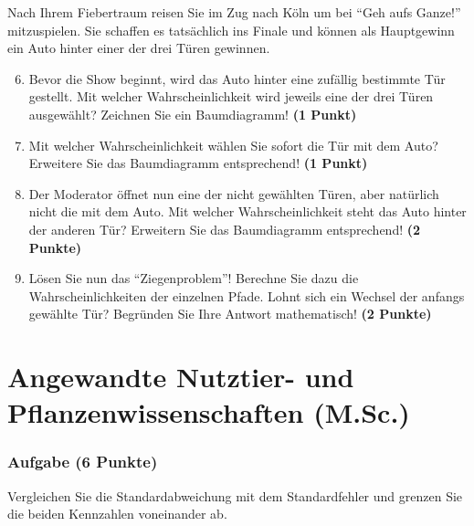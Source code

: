 \documentclass[a4paper, 9pt]{scrartcl}\usepackage[]{graphicx}\usepackage[]{xcolor}
\begin{document}
Nach Ihrem Fiebertraum reisen Sie im Zug nach K{\"o}ln um bei "`Geh aufs
Ganze!"' mitzuspielen. Sie schaffen es tats{\"a}chlich ins Finale und k{\"o}nnen
als Hauptgewinn ein Auto hinter einer der drei T{\"u}ren gewinnen. 

\begin{enumerate}
  \setcounter{enumi}{5}  
\item Bevor die Show beginnt, wird das Auto hinter eine zuf{\"a}llig bestimmte
  T{\"u}r gestellt. Mit welcher Wahrscheinlichkeit wird jeweils eine der drei
  T{\"u}ren ausgew{\"a}hlt? Zeichnen Sie ein Baumdiagramm! \textbf{(1 Punkt)}
\item Mit welcher Wahrscheinlichkeit w{\"a}hlen Sie sofort die T{\"u}r mit
  dem Auto? Erweitere Sie das Baumdiagramm entsprechend! \textbf{(1
    Punkt)}
\item Der Moderator {\"o}ffnet nun eine der nicht gew{\"a}hlten T{\"u}ren, aber
  nat{\"u}rlich nicht die mit dem Auto. Mit welcher Wahrscheinlichkeit steht
  das Auto hinter der anderen T{\"u}r? Erweitern Sie das Baumdiagramm
  entsprechend! \textbf{(2 Punkte)}
\item L{\"o}sen Sie nun das "`Ziegenproblem"'! Berechne Sie dazu die
  Wahrscheinlichkeiten der einzelnen Pfade. Lohnt sich ein Wechsel der
  anfangs gew{\"a}hlte T{\"u}r? Begr{\"u}nden Sie Ihre Antwort mathematisch!
  \textbf{(2 Punkte)}
\end{enumerate}
 






 
\clearpage
\part{Angewandte Nutztier- und Pflanzenwissenschaften (M.Sc.)}

\section{Aufgabe \hfill (6 Punkte)}
Vergleichen Sie die Standardabweichung mit dem Standardfehler und grenzen
Sie die beiden Kennzahlen voneinander ab.
\end{document}
